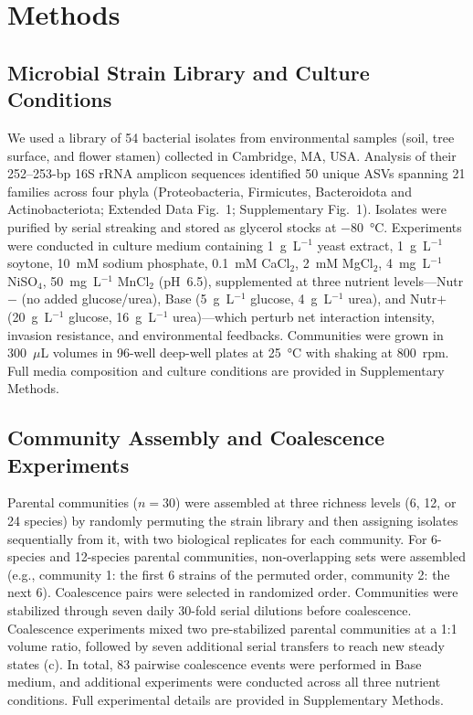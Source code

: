 \section{Methods}
\label{sec:methods}

\subsection*{Microbial Strain Library and Culture Conditions}
\label{sec:methods:strains}

We used a library of 54 bacterial isolates from environmental samples (soil, tree surface, and flower stamen) collected in Cambridge, MA, USA. Analysis of their 252--253-bp 16S rRNA amplicon sequences identified 50 unique ASVs spanning 21 families across four phyla (Proteobacteria, Firmicutes, Bacteroidota and Actinobacteriota; Extended Data Fig.~1; Supplementary Fig.~1). Isolates were purified by serial streaking and stored as glycerol stocks at $-80$~°C. Experiments were conducted in culture medium containing 1~g~L$^{-1}$ yeast extract, 1~g~L$^{-1}$ soytone, 10~mM sodium phosphate, 0.1~mM CaCl$_2$, 2~mM MgCl$_2$, 4~mg~L$^{-1}$ NiSO$_4$, 50~mg~L$^{-1}$ MnCl$_2$ (pH~6.5), supplemented at three nutrient levels---Nutr$-$ (no added glucose/urea), Base (5~g~L$^{-1}$ glucose, 4~g~L$^{-1}$ urea), and Nutr$+$ (20~g~L$^{-1}$ glucose, 16~g~L$^{-1}$ urea)---which perturb net interaction intensity, invasion resistance, and environmental feedbacks. Communities were grown in 300~$\mu$L volumes in 96-well deep-well plates at 25~°C with shaking at 800~rpm. Full media composition and culture conditions are provided in Supplementary Methods.


\subsection*{Community Assembly and Coalescence Experiments}
\label{sec:methods:coalescence}

Parental communities ($n = 30$) were assembled at three richness levels (6, 12, or 24 species) by randomly permuting the strain library and then assigning isolates sequentially from it, with two biological replicates for each community. For 6-species and 12-species parental communities, non-overlapping sets were assembled (e.g., community 1: the first 6 strains of the permuted order, community 2: the next 6). Coalescence pairs were selected in randomized order. Communities were stabilized through seven daily 30-fold serial dilutions before coalescence. Coalescence experiments mixed two pre-stabilized parental communities at a 1:1 volume ratio, followed by seven additional serial transfers to reach new steady states (c). In total, 83 pairwise coalescence events were performed in Base medium, and additional experiments were conducted across all three nutrient conditions. Full experimental details are provided in Supplementary Methods.


